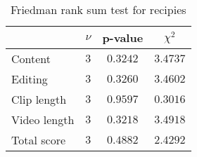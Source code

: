 \begin{table}[ht]
	\begin{center}
	\caption{Friedman rank sum test for recipies}
	\label{tab:fried_recip}
		\begin{tabular}{lccc}
		\toprule
			 & $\nu$ & p-value & $\chi^2$\\
			\midrule
			Content & $3$ & $0.3242$ & $3.4737$\\
			Editing & $3$ & $0.3260$ & $3.4602$\\
			Clip length & $3$ & $0.9597$ & $0.3016$\\
			Video length & $3$ & $0.3218$ & $3.4918$\\
			Total score & $3$ & $0.4882$ & $2.4292$\\
		\bottomrule
		\end{tabular}
	\end{center}
\end{table}